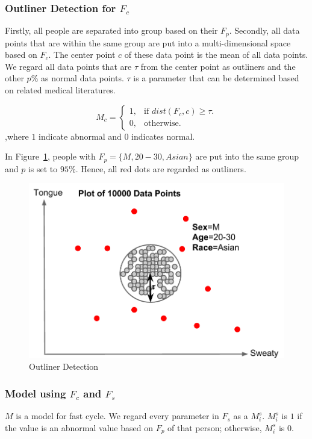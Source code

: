 \subsubsection{Outliner Detection for $F_c$}\label{sec:outliner}
Firstly, all people are separated into group based on their $F_p$. 
Secondly, all data points that are within the same group are put into a multi-dimensional space based on $F_c$. 
The center point $c$ of these data point is the mean of all data points. 
We regard all data points that are $\tau$ from the center point as outliners and the other $p\%$ as normal data points. 
$\tau$ is a parameter that can be determined based on related medical literatures. 

\begin{equation}
  M_c=\begin{cases}
    1, & \text{if $dist(F_c,c) \geq \tau$}.\\
    0, & \text{otherwise}.
  \end{cases}
\end{equation}
,where $1$ indicate abnormal and $0$ indicates normal.

In Figure~\ref{fig:outliner}, people with $F_p=\{M,20-30,Asian\}$ are put into 
the same group and $p$ is set to $95\%$. Hence, all red dots are regarded as outliners. 

\begin{figure}[ht]
\includegraphics[width=0.9\columnwidth]{experiment/outlinerDetection-crop}
\caption{Outliner Detection}
\label{fig:outliner}
\end{figure}

\subsubsection{Model using $F_c$ and $F_s$}
$M$ is a model for fast cycle. 
We regard every parameter in $F_s$ as a $M_i^s$. $M_i^s$ is $1$ 
if the value is an abnormal value based on $F_p$ of that person; 
otherwise, $M_i^s$ is $0$. 

